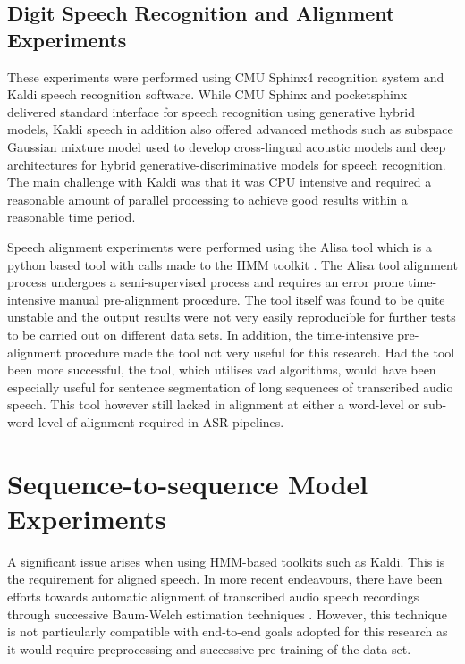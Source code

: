 \subsection{Digit Speech Recognition and Alignment Experiments}\label{sec_digitspeech}
These experiments were performed using CMU Sphinx4 recognition system and Kaldi speech recognition software.  While CMU Sphinx and pocketsphinx delivered standard interface for speech recognition using generative hybrid models, Kaldi speech in addition also offered advanced methods such as subspace Gaussian mixture model used to develop cross-lingual acoustic models and deep architectures for hybrid generative-discriminative models for speech recognition.   The main challenge with Kaldi was that it was CPU intensive and required a reasonable amount of parallel processing to achieve good results within a reasonable time period. 

Speech alignment experiments were performed using the Alisa \cite{stan2016alisa} tool which is a python based tool with calls made to the HMM toolkit \cite{young2002htk}.  The Alisa tool alignment process undergoes a semi-supervised process and requires an error prone time-intensive manual pre-alignment procedure.  The tool itself was found to be quite unstable and the output results were not very easily reproducible for further tests to be carried out on different data sets.  In addition, the time-intensive pre-alignment procedure made the tool not very useful for this research. Had the tool been more successful, the tool, which utilises \acrfull{vad} algorithms, would have been especially useful for sentence segmentation of long sequences of transcribed audio speech.  This tool however still lacked in alignment at either a word-level or sub-word level of alignment required in ASR pipelines.

\startblue
\section{Sequence-to-sequence Model Experiments}\label{sec_postalign}
A significant issue arises when using HMM-based toolkits such as Kaldi.  This is the requirement for aligned speech.  In more recent endeavours, there have been efforts towards automatic alignment of transcribed audio speech recordings through successive Baum-Welch estimation techniques \citep{gales2014speech,ragni2018automatic,ragni2014data}. However, this technique is not particularly compatible with end-to-end goals adopted for this research as it would require preprocessing and successive pre-training of the data set.

